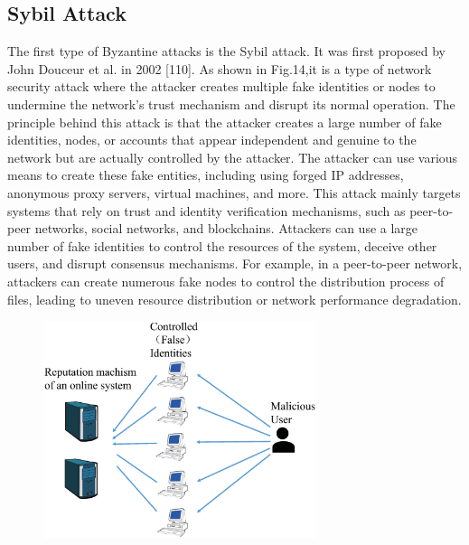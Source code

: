 \subsection{Sybil Attack}
The first type of Byzantine attacks is the Sybil attack.
It was first proposed by John Douceur et al. in 2002
[110]. As shown in Fig.14,it is a type of network security
attack where the attacker creates multiple fake identities
or nodes to undermine the network's trust mechanism and
disrupt its normal operation. The principle behind this
attack is that the attacker creates a large number of fake
identities, nodes, or accounts that appear independent and
genuine to the network but are actually controlled by the
attacker. The attacker can use various means to create
these fake entities, including using forged IP addresses,
anonymous proxy servers, virtual machines, and more.
This attack mainly targets systems that rely on trust
and identity verification mechanisms, such as
peer-to-peer networks, social networks, and blockchains. Attackers
can use a large number of fake identities to control the
resources of the system, deceive other users, and disrupt
consensus mechanisms. For example, in a peer-to-peer
network, attackers can create numerous fake nodes to
control the distribution process of files, leading to uneven
resource distribution or network performance degradation. 

\begin{figure}[h]
    \centering
    \includegraphics[width=1.0\linewidth,height=2.5in]{output/fig14.eps}
     \caption{}
     \label{fig14}
\end{figure}


